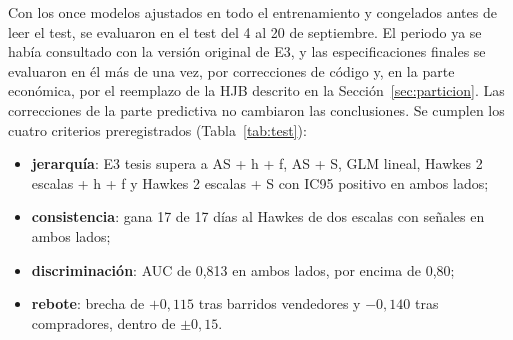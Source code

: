 Con los once modelos ajustados en todo el entrenamiento y congelados antes de leer el test, se evaluaron en el test del 4 al 20 de septiembre. El periodo ya se había consultado con la versión original de E3, y las especificaciones finales se evaluaron en él más de una vez, por correcciones de código y, en la parte económica, por el reemplazo de la HJB descrito en la Sección~\ref{sec:particion}. Las correcciones de la parte predictiva no cambiaron las conclusiones. Se cumplen los cuatro criterios preregistrados (Tabla~\ref{tab:test}):
\begin{itemize}[nosep]
\item \textbf{jerarquía}: E3 tesis supera a AS + h + f, AS + S, GLM lineal, Hawkes 2 escalas + h + f y Hawkes 2 escalas + S con IC95 positivo en ambos lados;
\item \textbf{consistencia}: gana 17 de 17 días al Hawkes de dos escalas con señales en ambos lados;
\item \textbf{discriminación}: AUC de 0,813 en ambos lados, por encima de 0,80;
\item \textbf{rebote}: brecha de $+0{,}115$ tras barridos vendedores y $-0{,}140$ tras compradores, dentro de $\pm0{,}15$.
\end{itemize}

